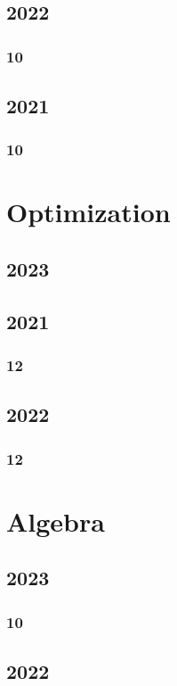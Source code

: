 \documentclass[11pt]{book}
\begin{document}
\section{2022}
\subsection{10}

\section{2021}
\subsection{10}

\chapter{Optimization}
\section{2023}

\section{2021}
\subsection{12}

\section{2022}
\subsection{12}

\chapter{Algebra}
\section{2023}
\subsection{10}

\section{2022}
\end{document}
